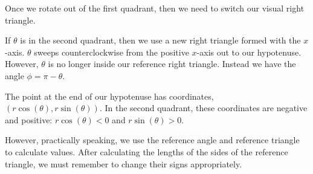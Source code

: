 \documentclass{ximera}
\begin{document}
\begin{image}
\end{image}




Once we rotate out of the first quadrant, then we need to switch our visual right triangle. 


If $\theta$ is in the second quadrant, then we use a new right triangle formed with the $x$-axis. $\theta$ sweeps counterclockwise from the positive $x$-axis out to our hypotenuse. However, $\theta$ is no longer inside our reference right triangle.  Instead we have the angle $\phi = \pi - \theta$.  

The point at the end of our hypotenuse has coordinates, $(r \cos(\theta), r \sin(\theta))$.  In the second quadrant, these coordinates are negative and positive: $r \cos(\theta) < 0$ and $r \sin(\theta) > 0$.

However, practically speaking, we use the reference angle and reference triangle to calculate values.  After calculating the lengths of the sides of the reference triangle, we must remember to change their signs appropriately. 
\end{document}

